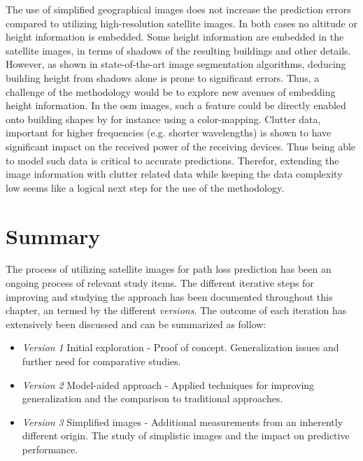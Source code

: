 The use of simplified geographical images does not increase the prediction errors compared to utilizing high-resolution satellite images. In both cases no altitude or height information is embedded. Some height information are embedded in the satellite images, in terms of shadows of the resulting buildings and other details. However, as shown in state-of-the-art image segmentation algorithms, deducing building height from shadows alone is prone to significant errors. Thus, a challenge of the methodology would be to explore new avenues of embedding height information. In the \gls{osm} images, such a feature could be directly enabled onto building shapes by for instance using a color-mapping. Clutter data, important for higher frequencies (e.g. shorter wavelengths) is shown to have significant impact on the received power of the receiving devices. Thus being able to model such data is critical to accurate predictions. Therefor, extending the image information with clutter related data while keeping the data complexity low seems like a logical next step for the use of the methodology.


\section{Summary}\label{sec:satellite_image_discussion}
The process of utilizing satellite images for path loss prediction has been an ongoing process of relevant study items. The different iterative steps for improving and studying the approach has been documented throughout this chapter, an termed by the different \emph{versions}. The outcome of each iteration has extensively been discussed and can be summarized as follow:
\begin{itemize}
    \item \emph{Version 1} Initial exploration - Proof of concept. Generalization issues and further need for comparative studies.
    \item \emph{Version 2} Model-aided approach - Applied techniques for improving generalization and the comparison to traditional approaches.
    \item \emph{Version 3} Simplified images - Additional measurements from an inherently different origin. The study of simplistic images and the impact on predictive performance.
\end{itemize}

\vspace{1em}

\vspace{1em}

